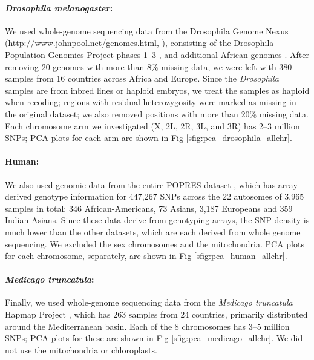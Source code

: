 \documentclass[11pt, oneside]{article}   	%
\newcommand\citep{\cite}
\newcommand{\Figure}{Fig }
\newcommand{\Figure}{{Figure }}
\begin{document}
\paragraph{\textit{Drosophila melanogaster}:}
We used whole-genome sequencing data 
from the Drosophila Genome Nexus (\url{http://www.johnpool.net/genomes.html}, \citep{lack2015drosophila}),
consisting of the Drosophila Population Genomics Project phases 1--3 \citep{langley2012genomic,pool2012population},
and additional African genomes \citep{lack2015drosophila}.
After removing 20 genomes with more than 8\% missing data,
we were left with 380 samples from 16 countries across Africa and Europe.
Since the \textit{Drosophila} samples are from inbred lines or haploid embryos, 
we treat the samples as haploid when recoding;
regions with residual heterozygosity were marked as missing in the original dataset;
we also removed positions with more than 20\% missing data. 
Each chromosome arm we investigated (X, 2L, 2R, 3L, and 3R) has 2--3 million SNPs;
PCA plots for each arm are shown in \Figure \ref{sfig:pca_drosophila_allchr}.

\paragraph{Human:}
We also used genomic data from the entire POPRES dataset \citep{nelson2008population},
which has array-derived genotype information for 447,267 SNPs across the 22 autosomes
of 3,965 samples in total: 346 African-Americans, 73 Asians, 3,187 Europeans and 359 Indian Asians.
Since these data derive from genotyping arrays, the SNP density is much lower than the other datasets,
which are each derived from whole genome sequencing.
We excluded the sex chromosomes and the mitochondria.
PCA plots for each chromosome, separately, are shown in \Figure \ref{sfig:pca_human_allchr}.


\paragraph{\textit{Medicago truncatula}:}
Finally, we used whole-genome sequencing data from the \textit{Medicago truncatula} Hapmap Project \citep{tang2014improved},
which has 263 samples from 24 countries,
primarily distributed around the Mediterranean basin.
Each of the 8 chromosomes has 3--5 million SNPs;
PCA plots for these are shown in \Figure \ref{sfig:pca_medicago_allchr}.
We did not use the mitochondria or chloroplasts.
\end{document}
